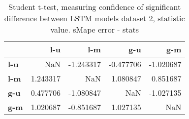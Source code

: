 \begin{table}[h]
\centering
\caption{Student t-test, measuring confidence of significant difference between LSTM models dataset 2, statistic value. sMape error - stats}
\label{table:ttest-stats-lstm-experiments-sMAPE-dataset-2}
\begin{tabular}{lrrrr}
\toprule
{} &       l-u &       l-m &       g-u &       g-m \\
\midrule
\textbf{l-u} &       NaN & -1.243317 & -0.477706 & -1.020687 \\
\textbf{l-m} &  1.243317 &       NaN &  1.080847 &  0.851687 \\
\textbf{g-u} &  0.477706 & -1.080847 &       NaN & -1.027135 \\
\textbf{g-m} &  1.020687 & -0.851687 &  1.027135 &       NaN \\
\bottomrule
\end{tabular}
\end{table}
